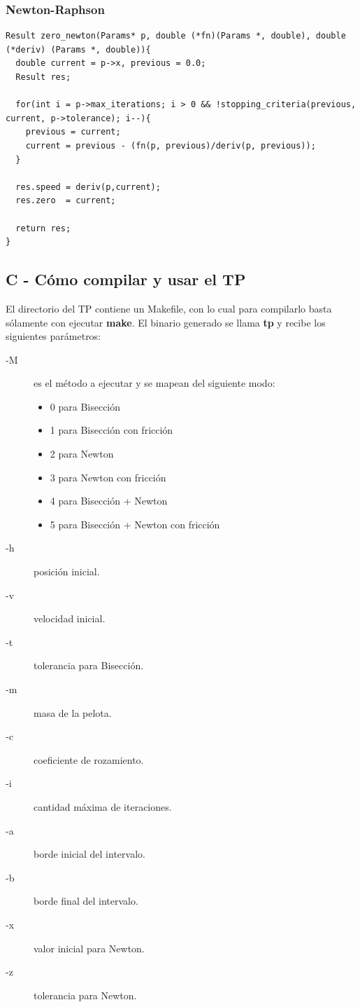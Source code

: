 \documentclass[a4paper]{article}
\begin{document}
\subsubsection{Newton-Raphson}
\begin{verbatim}
Result zero_newton(Params* p, double (*fn)(Params *, double), double (*deriv) (Params *, double)){
  double current = p->x, previous = 0.0;
  Result res;

  for(int i = p->max_iterations; i > 0 && !stopping_criteria(previous, current, p->tolerance); i--){
    previous = current;
    current = previous - (fn(p, previous)/deriv(p, previous));
  }

  res.speed = deriv(p,current);
  res.zero  = current;

  return res;
}
\end{verbatim}

\subsection{C - Cómo compilar y usar el TP}
El directorio del TP contiene un Makefile, con lo cual para compilarlo basta sólamente con ejecutar \textbf{make}. El binario generado se llama \textbf{tp} y recibe los siguientes parámetros:

\begin{description}
\item[-M] es el método a ejecutar y se mapean del siguiente modo:
\begin{itemize}
  \item 0 para Bisección
  \item 1 para Bisección con fricción
  \item 2 para Newton
  \item 3 para Newton con fricción
  \item 4 para Bisección + Newton
  \item 5 para Bisección + Newton con fricción
\end{itemize}
\item[-h] posición inicial.
\item[-v] velocidad inicial.
\item[-t] tolerancia para Bisección.
\item[-m] masa de la pelota.
\item[-c] coeficiente de rozamiento.
\item[-i] cantidad máxima de iteraciones.
\item[-a] borde inicial del intervalo.
\item[-b] borde final del intervalo.
\item[-x] valor inicial para Newton.
\item[-z] tolerancia para Newton.
\end{description}
\end{document}
